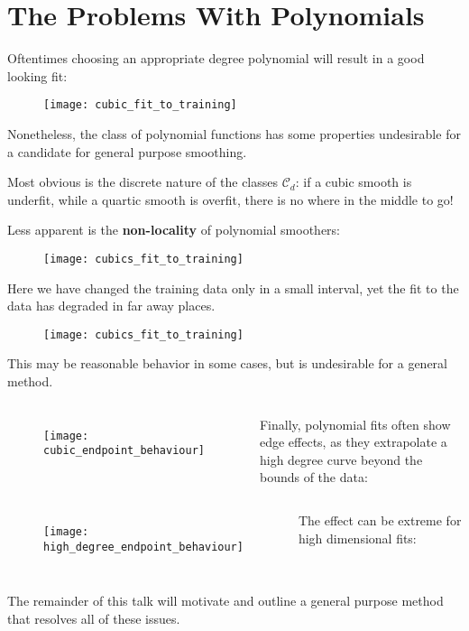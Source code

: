 \section{The Problems With Polynomials}
%
\begin{frame}
  Oftentimes choosing an appropriate degree polynomial will result in a  good looking fit:
  \begin{figure}
    \texttt{[image: cubic\_fit\_to\_training]}
  \end{figure}
  Nonetheless, the class of polynomial functions has some properties undesirable for a candidate for general purpose smoothing.
\end{frame}
%
\begin{frame}
  Most obvious is the discrete nature of the classes $\mathcal{C}_d$: if a cubic smooth is underfit, while a quartic smooth is overfit, there is no where in the middle to go!
\end{frame}
%
\begin{frame}
  Less apparent is the \textbf{non-locality} of polynomial smoothers:
  \begin{figure}
    \texttt{[image: cubics\_fit\_to\_training]}
  \end{figure}
\end{frame}
%
\begin{frame}
  Here we have changed the training data only in a small interval, yet the fit to the data has degraded in far away places.
  \begin{figure}
    \texttt{[image: cubics\_fit\_to\_training]}
  \end{figure}
  This may be reasonable behavior in some cases, but is undesirable for a general method.
\end{frame}
%
\begin{frame}
  \begin{columns}
      \begin{figure}
        \texttt{[image: cubic\_endpoint\_behaviour]}
      \end{figure}
      Finally, polynomial fits often show edge effects, as they extrapolate a high degree curve beyond the bounds of the data:
  \end{columns}
\end{frame}
%
\begin{frame}
  \begin{columns}
      \begin{figure}
        \texttt{[image: high\_degree\_endpoint\_behaviour]}
      \end{figure}
      The effect can be extreme for high dimensional fits:
  \end{columns}
\end{frame}
%
\begin{frame}
  The remainder of this talk will motivate and outline a general purpose method that resolves all of these issues.
\end{frame}	
